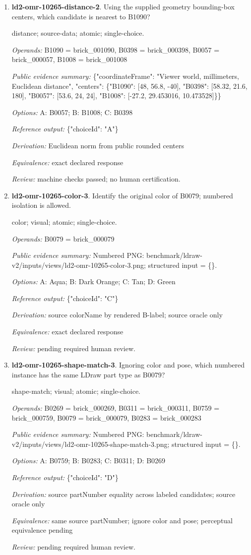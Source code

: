 \begin{enumerate}
\item \textbf{ld2-omr-10265-distance-2}. Using the supplied geometry bounding-box centers, which candidate is nearest to B1090?
\par{\small distance; source-data; atomic; single-choice.\par\textit{Operands:} B1090 = brick\_001090, B0398 = brick\_000398, B0057 = brick\_000057, B1008 = brick\_001008\par\textit{Public evidence summary:} \{"coordinateFrame": "Viewer world, millimeters, Euclidean distance", "centers": \{"B1090": [48, 56.8, -40], "B0398": [58.32, 21.6, 180], "B0057": [53.6, 24, 24], "B1008": [-27.2, 29.453016, 10.473528]\}\}\par\textit{Options:} A: B0057; B: B1008; C: B0398\par\textit{Reference output:} \{"choiceId": "A"\}\par\textit{Derivation:} Euclidean norm from public rounded centers\par\textit{Equivalence:} exact declared response\par\textit{Review:} machine checks passed; no human certification.}
\item \textbf{ld2-omr-10265-color-3}. Identify the original color of B0079; numbered isolation is allowed.
\par{\small color; visual; atomic; single-choice.\par\textit{Operands:} B0079 = brick\_000079\par\textit{Public evidence summary:} Numbered PNG: benchmark/ldraw-v2/inputs/views/ld2-omr-10265-color-3.png; structured input = \{\}.\par\textit{Options:} A: Aqua; B: Dark Orange; C: Tan; D: Green\par\textit{Reference output:} \{"choiceId": "C"\}\par\textit{Derivation:} source colorName by rendered B-label; source oracle only\par\textit{Equivalence:} exact declared response\par\textit{Review:} pending required human review.}
\item \textbf{ld2-omr-10265-shape-match-3}. Ignoring color and pose, which numbered instance has the same LDraw part type as B0079?
\par{\small shape-match; visual; atomic; single-choice.\par\textit{Operands:} B0269 = brick\_000269, B0311 = brick\_000311, B0759 = brick\_000759, B0079 = brick\_000079, B0283 = brick\_000283\par\textit{Public evidence summary:} Numbered PNG: benchmark/ldraw-v2/inputs/views/ld2-omr-10265-shape-match-3.png; structured input = \{\}.\par\textit{Options:} A: B0759; B: B0283; C: B0311; D: B0269\par\textit{Reference output:} \{"choiceId": "D"\}\par\textit{Derivation:} source partNumber equality across labeled candidates; source oracle only\par\textit{Equivalence:} same source partNumber; ignore color and pose; perceptual equivalence pending\par\textit{Review:} pending required human review.}

\end{enumerate}
